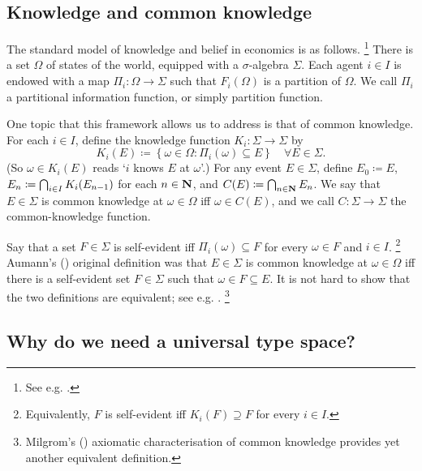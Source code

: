 \documentclass[11pt,letterpaper,reqno,oneside]{article}
\begin{document}
\subsection{Knowledge and common knowledge}
\label{sec:belief_hierarchies:K_and_CK}

The standard model of knowledge and belief in economics is as follows.%
	\footnote{See e.g. \textcite[][ch. 5]{OsborneRubinstein1994}.}
There is a set $\Omega$ of states of the world, equipped with a $\sigma$-algebra $\Sigma$. Each agent $i \in I$ is endowed with a map $\Pi_i : \Omega \to \Sigma$ such that $F_i(\Omega)$ is a partition of $\Omega$. We call $\Pi_i$ a partitional information function, or simply partition function.

One topic that this framework allows us to address is that of common knowledge. For each $i \in I$, define the knowledge function $K_i : \Sigma \to \Sigma$ by
%
\begin{equation*}
	K_i(E) \coloneqq \left\{ \omega \in \Omega : \Pi_i(\omega) \subseteq E \right\} 
	\quad \forall E \in \Sigma .
\end{equation*}
%
(So $\omega \in K_i(E)$ reads `$i$ knows $E$ at $\omega$'.) For any event $E \in \Sigma$, define $E_0 \coloneqq E$, $E_n \coloneqq \bigcap_{i \in I} K_i(E_{n-1})$ for each $n \in \mathbf{N}$, and $C(E) \coloneqq \bigcap_{n \in \mathbf{N}} E_n$. We say that $E \in \Sigma$ is common knowledge at $\omega \in \Omega$ iff $\omega \in C(E)$, and we call $C : \Sigma \to \Sigma$ the common-knowledge function.

Say that a set $F \in \Sigma$ is self-evident iff $\Pi_i(\omega) \subseteq F$ for every $\omega \in F$ and $i \in I$.%
	\footnote{Equivalently, $F$ is self-evident iff $K_i(F) \supseteq F$ for every $i \in I$.}
Aumann's (\citeyear{Aumann1976}) original definition was that $E \in \Sigma$ is common knowledge at $\omega \in \Omega$ iff there is a self-evident set $F \in \Sigma$ such that $\omega \in F \subseteq E$. It is not hard to show that the two definitions are equivalent; see e.g. \textcite[][Proposition 74.2]{OsborneRubinstein1994}.%
	\footnote{Milgrom's (\citeyear{Milgrom1981ecta}) axiomatic characterisation of common knowledge provides yet another equivalent definition.}



\subsection{Why do we need a universal type space?}
\label{sec:belief_hierarchies:why_universal}
\end{document}
